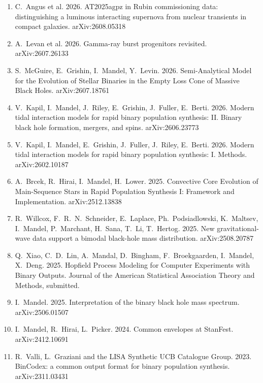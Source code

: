 \documentclass[margin,line]{res}
\begin{document}
\begin{resume}
\begin{enumerate}
\item C.~Angus et al. 2026.  AT2025agpz in Rubin commissioning data: distinguishing a luminous interacting supernova from nuclear transients in compact galaxies.  arXiv:2608.05318

\item A.~Levan et al. 2026. Gamma-ray burst progenitors revisited.  arXiv:2607.26133

\item S.~McGuire, E.~Grishin, I.~Mandel, Y.~Levin.  2026.  Semi-Analytical Model for the Evolution of Stellar Binaries in the Empty Loss Cone of Massive Black Holes.  arXiv:2607.18761

\item V.~Kapil, I.~Mandel, J.~Riley, E.~Grishin, J.~Fuller, E.~Berti. 2026. Modern tidal interaction models for rapid binary population synthesis: II. Binary black hole formation, mergers, and spins.  arXiv:2606.23773

\item V.~Kapil, I.~Mandel, E.~Grishin, J.~Fuller, J.~Riley, E.~Berti.  2026.  Modern tidal interaction models for rapid binary population synthesis:  I. Methods.  arXiv:2602.10187

\item A.~Brcek, R.~Hirai, I.~Mandel, H.~Lower. 2025. Convective Core Evolution of Main-Sequence Stars in Rapid Population Synthesis I: Framework and Implementation. arXiv:2512.13838

\item R.~Willcox, F.~R.~N.~Schneider, E.~Laplace, Ph.~Podsiadlowski, K.~Maltsev, I.~Mandel, P.~Marchant, H.~Sana, T.~Li, T.~Hertog. 2025. New gravitational-wave data support a bimodal black-hole mass distribution. arXiv:2508.20787

\item Q.~Xiao, C.~D.~Lin, A.~Mandal, D.~Bingham, F.~Broekgaarden, I.~Mandel, X.~Deng.  2025.  Hopfield Process Modeling for Computer Experiments with Binary Outputs.  Journal of the American Statistical Association Theory and Methods, submitted. 

\item I.~Mandel.  2025. Interpretation of the binary black hole mass spectrum.  arXiv:2506.01507

\item I.~Mandel, R.~Hirai, L.~Picker.  2024. Common envelopes at StanFest. arXiv:2412.10691 

\item R.~Valli, L.~Graziani and the LISA Synthetic UCB Catalogue Group.  2023. BinCodex: a common output format for binary population synthesis.  arXiv:2311.03431


\end{enumerate}
\end{resume}
\end{document}
